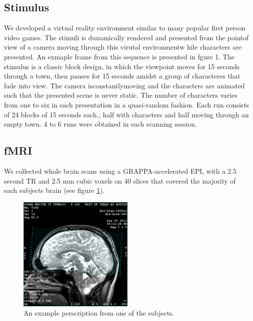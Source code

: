 \documentclass[draft]{article}
\begin{document}
\subsection{Stimulus}
We developed a virtual reality environment similar to many popular first person video games.
The stimuli is dunamically rendered and presented from the pointof view of a camera moving through this virutal environmentw hile characters are presented.
An exmaple frame from this sequence is presented in fgure 1.
The stimulus is a classic block design, in which the viewpoint moves for 15 seconds through a town, then pauses for 15 seconds amidst a group of characteres that fade into view.
The camera isconstantlymoving and the characters are animated such that the presented scene is never static.
The number of characters varies from one to six in each presentation in a quasi-random fashion.
Each run consists of 24 blocks of 15 seconds each., half with characters and half moving through an empty town.
4 to 6 runs were obtained in each scanning session.

\subsection{fMRI}
We collected whole brain scans using a GRAPPA-accelerated EPI, with a 2.5 second TR and 2.5 mm cubic voxels on 40 slices that covered the majority of each subjects brain (see figure \ref{fig:rx}).

\begin{figure}[!htbp]
\centering
\includegraphics[width=0.5\textwidth]{rx}
\caption{An example perscription from one of the subjects.}
\label{fig:rx}
\end{figure}
\end{document}
